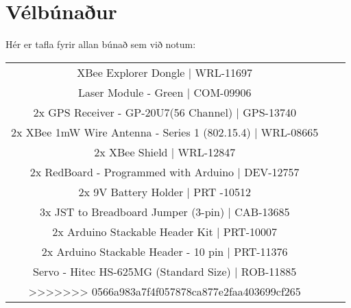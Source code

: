 ﻿\section{Vélbúnaður}
Hér er tafla fyrir allan búnað sem við notum:

\begin{center}
\begin{tabular}{ |c|c|c| } 
 \hline
 XBee Explorer Dongle | WRL-11697 \\
 Laser Module - Green | COM-09906 \\
 2x GPS Receiver - GP-20U7(56 Channel) | GPS-13740 \\
 2x XBee 1mW Wire Antenna - Series 1 (802.15.4) | WRL-08665 \\
 2x XBee Shield | WRL-12847 \\
 2x RedBoard - Programmed with Arduino | DEV-12757 \\
 2x 9V Battery Holder | PRT -10512 \\
 3x JST to Breadboard Jumper (3-pin) | CAB-13685 \\
 2x Arduino Stackable Header Kit | PRT-10007 \\
 2x Arduino Stackable Header - 10 pin | PRT-11376 \\
 Servo - Hitec HS-625MG (Standard Size) | ROB-11885 \\
>>>>>>> 0566a983a7f4f057878ca877e2faa403699cf265
 \hline
\end{tabular}
\end{center}